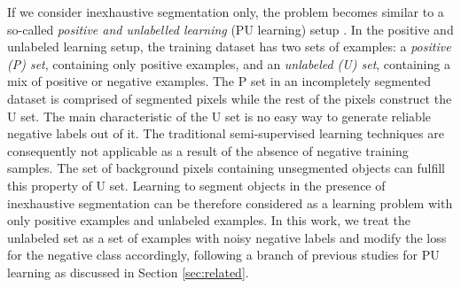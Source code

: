 

If we consider inexhaustive segmentation only, the problem becomes similar to a so-called \textit{positive and unlabelled learning} (PU learning) setup \cite{li2005learning}.
In the positive and unlabeled learning setup, the training dataset has two sets of examples: a \textit{positive (P) set}, containing only positive examples, and an \textit{unlabeled (U) set}, containing a mix of positive or negative examples.
The P set in an incompletely segmented dataset is comprised of segmented pixels while the rest of the pixels construct the U set.
The main characteristic of the U set is no easy way to generate reliable negative labels out of it.
The traditional semi-supervised learning techniques are consequently not applicable as a result of the absence of negative training samples.
The set of background pixels containing unsegmented objects can fulfill this property of U set.
Learning to segment objects in the presence of inexhaustive segmentation can be therefore considered as a learning problem with only positive examples and unlabeled examples.
In this work, we treat the unlabeled set as a set of examples with noisy negative labels and modify the loss for the negative class accordingly, following a branch of previous studies for PU learning as discussed in Section \ref{sec:related}.



